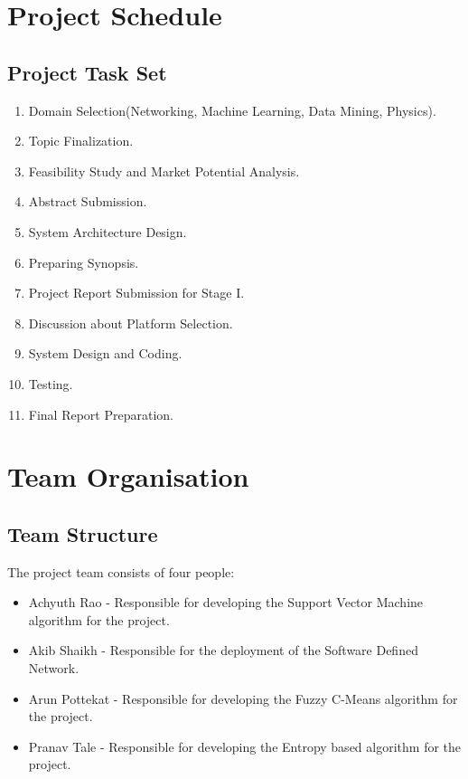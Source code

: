 \documentclass[12pt,a4paper,final]{report}
\begin{document}
\section{Project Schedule}

\subsection{Project Task Set}

\begin{enumerate}
\item
Domain Selection(Networking, Machine Learning, Data Mining, Physics).
\item
Topic Finalization.
\item
Feasibility Study and Market Potential Analysis.
\item
Abstract Submission.
\item
System Architecture Design.
\item
Preparing Synopsis.
\item
Project Report Submission for Stage I.
\item
Discussion about Platform Selection.
\item
System Design and Coding.
\item
Testing.
\item
Final Report Preparation.
\end{enumerate}

\section{Team Organisation}

\subsection{Team Structure}

The project team consists of four people:

\begin{itemize}
\item
Achyuth Rao - Responsible for developing the Support Vector Machine algorithm for the project.

\item
Akib Shaikh - Responsible for the deployment of the Software Defined Network.

\item
Arun Pottekat - Responsible for developing the Fuzzy C-Means algorithm for the project.

\item
Pranav Tale - Responsible for developing the Entropy based algorithm for the project.

\end{itemize}
\end{document}
